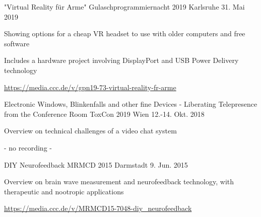 
\begin{cventries}
  \cventry
    { "Virtual Reality für Arme" } %
    {Gulaschprogrammiernacht 2019} %
    {Karlsruhe} %
    {31. Mai 2019} %
    {
      \begin{cvitems} %
        \item {Showing options for a cheap VR headset to use with older computers and free software}
        \item {Includes a hardware project involving DisplayPort and USB Power Delivery technology}
        \item {\href{https://media.ccc.de/v/gpn19-73-virtual-reality-fr-arme }{https://media.ccc.de/v/gpn19-73-virtual-reality-fr-arme } }
      \end{cvitems}
    }
  \cventry
    { Electronic Windows, Blinkenfalls and other fine Devices - Liberating Telepresence from the Conference Room } %
    {ToxCon 2019} %
    {Wien} %
    {12.-14. Okt. 2018} %
    {
      \begin{cvitems} %
        \item { Overview on technical challenges of a video chat system }
        \item { - no recording - }
      \end{cvitems}
    }


  \cventry
    { DIY Neurofeedback } %
    {MRMCD 2015} %
    {Darmstadt} %
    {9. Jun. 2015} %
    {
      \begin{cvitems} %
        \item {Overview on brain wave measurement and neurofeedback technology, with therapeutic and nootropic applications}
        \item {\href{https://media.ccc.de/v/MRMCD15-7048-diy\_neurofeedback }{https://media.ccc.de/v/MRMCD15-7048-diy\_neurofeedback } }
      \end{cvitems}
    }

\end{cventries}
